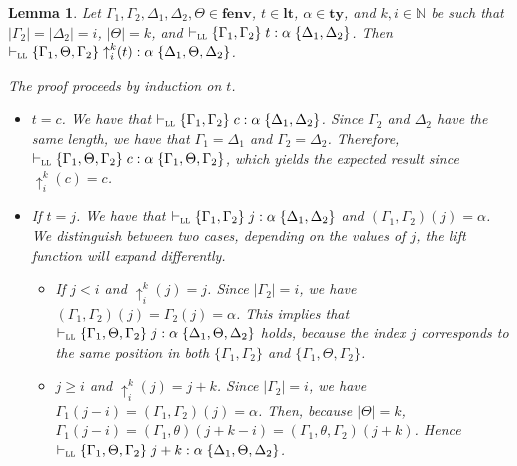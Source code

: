 \documentclass[submission,creativecommons]{eptcs}
\newtheorem{lemma}{Lemma}
\newcommand{\mybox}{\raisebox{3.5pt}{\framebox[7pt]{\rule{0mm}{0.3pt}}}}
\def\qed{\ifmmode\mybox\else{\unskip\nobreak\hfil
\penalty50\hskip1em\null\nobreak\hfil\mybox
\parfillskip=0pt\finalhyphendemerits=0\endgraf}\fi}
\newenvironment{proof}{%

\vspace{.7ex}
\noindent{\it Proof.} \rm}{\qed}
\newcommand{\liftt}[3]{{\uparrow}^{#2}_{#3}(#1)}
\newcommand{\tytm}[4]{\{#1\}\;#2:#3\;\{#4\}}
\newcommand{\der}[1]{\vdash_{#1}}
\newcommand{\Sll}{{\textsc{ll}}}
\newcommand{\ltm}{\mathord{\mathbf{lt}}}
\newcommand{\ty}{\mathord{\mathbf{ty}}}
\newcommand{\fenv}{\mathord{\mathbf{fenv}}}
\begin{document}
\begin{lemma}\label{lemma:philippe}
Let $\Gamma_1, \Gamma_2, \Delta_1, \Delta_2, \Theta \in \fenv$, $t \in \ltm$, $\alpha \in \ty$, and $k, i \in \mathbb{N}$ be
such that $|\Gamma_2| = |\Delta_2| = i$, $|\Theta| = k$, and $\der{\Sll}\tytm{\Gamma_1, \Gamma_2}{t}{\alpha}{\Delta_1, \Delta_2}$.
Then $\der{\Sll}\tytm{\Gamma_1, \Theta, \Gamma_2}{\liftt{t}{k}{i}}{\alpha}{\Delta_1, \Theta, \Delta_2}$.
\begin{proof}
The proof proceeds by induction on $t$.
\begin{itemize}
\item $t = c$.\quad
We have that $\der{\Sll}\tytm{\Gamma_1, \Gamma_2}{c}{\alpha}{\Delta_1, \Delta_2}$. Since $\Gamma_2$ and $\Delta_2$ have the same
length, we have that $\Gamma_1 = \Delta_1$ and $\Gamma_2 = \Delta_2$. Therefore,
$\der{\Sll}\tytm{\Gamma_1, \Theta, \Gamma_2}{c}{\alpha}{\Gamma_1, \Theta, \Gamma_2}$, which yields the expected result since
$\liftt{c}{k}{i} = c$.


\item If $t = j$.\quad
We have that $\der{\Sll}\tytm{\Gamma_1, \Gamma_2}{j}{\alpha}{\Delta_1, \Delta_2}$ and $(\Gamma_1, \Gamma_2)(j)=\alpha$.
We distinguish between two cases, depending on the values of $j$, the \textit{lift} function will expand differently.
\begin{itemize}
\item If $j < i$ and $\liftt{j}{k}{i} = j$.\quad
Since $|\Gamma_2| = i$, we have $(\Gamma_1, \Gamma_2)(j)=\Gamma_2(j) = \alpha$.
This implies that $\der{\Sll}\tytm{\Gamma_1, \Theta, \Gamma_2}{j}{\alpha}{\Delta_1, \Theta, \Delta_2}$ holds, because the
index $j$ corresponds to the same position in both $\{\Gamma_1, \Gamma_2\}$ and $\{\Gamma_1, \Theta, \Gamma_2\}$.
\item $j \ge i$ and $\liftt{j}{k}{i} = j + k$.\quad
Since $|\Gamma_2| = i$, we have $\Gamma_1(j - i) = (\Gamma_1, \Gamma_2)(j) = \alpha$.
Then, because $|\Theta| = k$, $\Gamma_1(j - i) = (\Gamma_1,\theta)(j + k - i) = (\Gamma_1,\theta,\Gamma_2)(j+k)$.
Hence $\der{\Sll}\tytm{\Gamma_1, \Theta, \Gamma_2}{j + k}{\alpha}{\Delta_1, \Theta, \Delta_2}$.
\end{itemize}


\end{itemize}
\end{proof}
\end{lemma}
\end{document}
